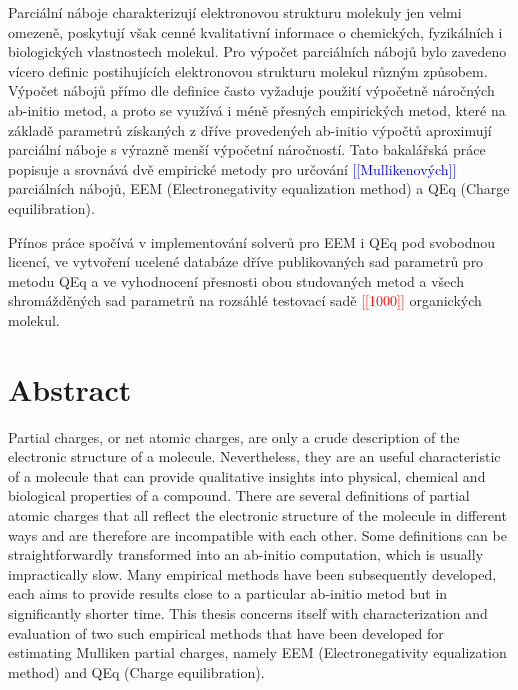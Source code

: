 \documentclass[10pt,draft,oneside]{fithesis2}
\newcommand\fixme[1]{\textcolor{red}{[[#1]]}}
\newcommand\todo[1]{\textcolor{blue}{[[#1]]}}
\begin{document}
\begin{ThesisAbstract}

Parciální náboje charakterizují elektronovou strukturu molekuly jen velmi omezeně, poskytují však cenné kvalitativní informace o chemických, fyzikálních i biologických vlastnostech molekul. Pro výpočet parciálních nábojů bylo zavedeno vícero definic postihujících elektronovou strukturu molekul různým způsobem. Výpočet nábojů přímo dle definice často vyžaduje použití výpočetně náročných ab-initio metod, a proto se využívá i méně přesných empirických metod, které na základě parametrů získaných z dříve provedených ab-initio výpočtů aproximují parciální náboje s výrazně menší výpočetní náročností. Tato bakalářská práce popisuje a srovnává dvě empirické metody pro určování \todo{Mullikenových} parciálních nábojů, EEM (Electronegativity equalization method) a QEq (Charge equilibration).

Přínos práce spočívá v implementování solverů pro EEM i QEq pod svobodnou licencí, ve vytvoření ucelené databáze dříve publikovaných sad parametrů pro metodu QEq a ve vyhodnocení přesnosti obou studovaných metod a všech shromážděných sad parametrů na rozsáhlé testovací sadě \fixme{1000} organických molekul.

\begingroup
\let\clearpage\relax
{}
\chapter*{Abstract}
\endgroup

Partial charges, or net atomic charges, are only a crude description of the electronic structure of a molecule. Nevertheless, they are an useful characteristic of a molecule that can provide qualitative insights into physical, chemical and biological properties of a compound. There are several definitions of partial atomic charges that all reflect the electronic structure of the molecule in different ways and are therefore are incompatible with each other. Some definitions can be straightforwardly transformed into an ab-initio computation, which is usually impractically slow. Many empirical methods have been subsequently developed, each aims to provide results close to a particular ab-initio metod but in significantly shorter time. This thesis concerns itself with characterization and evaluation of two such empirical methods that have been developed for estimating Mulliken partial charges, namely EEM (Electronegativity equalization method) and QEq (Charge equilibration).


\end{ThesisAbstract}
\end{document}
